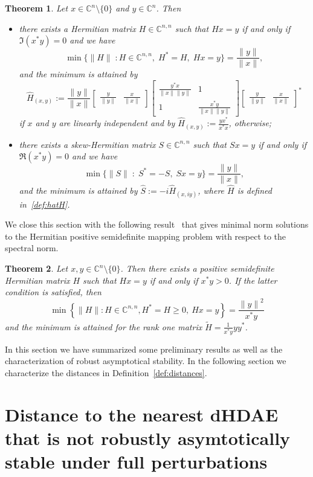 \documentclass[11pt]{article}
\newcommand {\mat}[1]{\left[\begin{array}{#1}}
\newcommand {\rix}{\end{array}\right]}
\newtheorem{theorem}{Theorem}
\newcommand{\C}{\mathbb C}
\begin{document}
%
\begin{theorem}\label{map:herm}
	Let $x \in \C^n\setminus\{0\}$ and $y\in \C^{n}$. Then
	\begin{itemize}
		\item [a)] there exists a Hermitian matrix $H \in \C^{n,n}$ such that $Hx = y$ if and only if $\Im{(x^*y)} = 0$ and we have
		\[
		\min\big\{\|H\|\; : H\in \C^{n,n},\; H^*=H, \; Hx=y\big\} = \frac{\|y\|}{\|x\|},
		\]
		and the minimum is attained by
		\begin{equation}\label{def:hatH}
			\hat H_{(x,y)} := \frac{\|y\|}{\|x\|}\mat{cc}\frac{y}{\|y\|}&\frac{x}{\|x\|} \rix \mat{cc}\frac{y^*x}{\|x\|\|y\|}&1\\1&\frac{x^*y}{\|x\|\|y\|} \rix \mat{cc}\frac{y}{\|y\|}&\frac{x}{\|x\|} \rix^*
		\end{equation}
		if $x$ and $y$ are linearly independent and by $\hat H_{(x,y)}:=\frac{yx^*}{x^*x}$, otherwise;
		\item [b)] there exists a skew-Hermitian matrix $S \in \C^{n,n}$ such that $Sx = y$ if and only if $\Re{(x^*y)} = 0$ and we have
		\[
		\min\big\{\|S\|\; :\; S ^*=-S, \; Sx=y\big\} = \frac{\|y\|}{\|x\|},
		\]
		and the minimum is attained by $\hat S:=-i\hat H_{(x,iy)}$, where $\hat{H}$ is defined in~\eqref{def:hatH}.
	\end{itemize}
\end{theorem}

We close this section with the following result~\cite[Theorem 2.3]{MehMS16} that gives minimal norm solutions to the Hermitian positive semidefinite mapping problem with respect to the spectral norm.
\begin{theorem}\label{map:def}
    Let $x,y \in \C^n \setminus \{0\}$. Then there exists a positive semidefinite Hermitian matrix $H$ such that $Hx=y$ if and only if $x^*y > 0$. If the latter condition is satisfied, then
    \[
    \min\left \{\|H\|:H \in \C^{n,n},H^*=H \geq 0,~Hx=y\right \}=\frac{{\|y\|}^2}{x^*y}
    \]
    and the minimum is attained for the rank one matrix
    $\tilde H=\frac{1}{x^*y}yy^*$.
\end{theorem}

\noindent In this section we have summarized some preliminary results as well as the characterization of robust asymptotical stability. In the following section we  characterize the distances in Definition~\ref{def:distances}.

\section{Distance to the nearest dHDAE that is not robustly asymtotically stable under full perturbations}\label{sec:dist}
\end{document}
